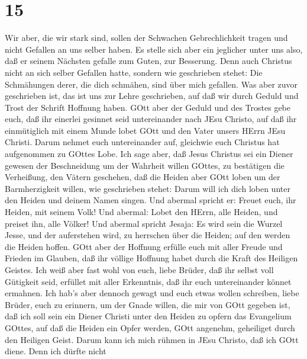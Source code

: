 \hypertarget{section-14}{%
\section{15}\label{section-14}}

 Wir aber, die wir stark sind, sollen der Schwachen
Gebrechlichkeit tragen und nicht Gefallen an uns selber haben.
 Es stelle sich aber ein jeglicher unter uns also, daß er
seinem Nächsten gefalle zum Guten, zur Besserung.  Denn auch
Christus nicht an sich selber Gefallen hatte, sondern wie geschrieben
stehet: Die Schmähungen derer, die dich schmähen, sind über mich
gefallen.  Was aber zuvor geschrieben ist, das ist uns zur
Lehre geschrieben, auf daß wir durch Geduld und Trost der Schrift
Hoffnung haben.  GOtt aber der Geduld und des Trostes gebe
euch, daß ihr einerlei gesinnet seid untereinander nach JEsu Christo,
 auf daß ihr einmütiglich mit einem Munde lobet GOtt und den
Vater unsers HErrn JEsu Christi.  Darum nehmet euch
untereinander auf, gleichwie euch Christus hat aufgenommen zu GOttes
Lobe.  Ich sage aber, daß Jesus Christus sei ein Diener
gewesen der Beschneidung um der Wahrheit willen GOttes, zu bestätigen
die Verheißung, den Vätern geschehen,  daß die Heiden aber
GOtt loben um der Barmherzigkeit willen, wie geschrieben stehet: Darum
will ich dich loben unter den Heiden und deinem Namen singen.
 Und abermal spricht er: Freuet euch, ihr Heiden, mit
seinem Volk!  Und abermal: Lobet den HErrn, alle Heiden,
und preiset ihn, alle Völker!  Und abermal spricht Jesaja:
Es wird sein die Wurzel Jesse, und der auferstehen wird, zu herrschen
über die Heiden; auf den werden die Heiden hoffen.  GOtt
aber der Hoffnung erfülle euch mit aller Freude und Frieden im Glauben,
daß ihr völlige Hoffnung habet durch die Kraft des Heiligen Geistes.
 Ich weiß aber fast wohl von euch, liebe Brüder, daß ihr
selbst voll Gütigkeit seid, erfüllet mit aller Erkenntnis, daß ihr euch
untereinander könnet ermahnen.  Ich hab's aber dennoch
gewagt und euch etwas wollen schreiben, liebe Brüder, euch zu erinnern,
um der Gnade willen, die mir von GOtt gegeben ist,  daß ich
soll sein ein Diener Christi unter den Heiden zu opfern das Evangelium
GOttes, auf daß die Heiden ein Opfer werden, GOtt angenehm, geheiliget
durch den Heiligen Geist.  Darum kann ich mich rühmen in
JEsu Christo, daß ich GOtt diene.  Denn ich dürfte nicht
